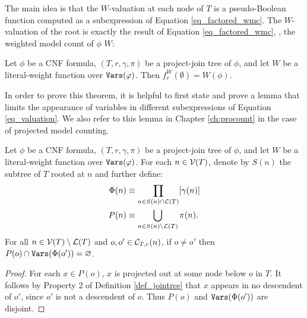 The main idea is that the $W$-valuation at each node of $T$ is a pseudo-Boolean function computed as a subexpression of Equation \eqref{eq_factored_wmc}. The $W$-valuation of the root is exactly the result of Equation \eqref{eq_factored_wmc}, \ie, the weighted model count of $\phi$ \wrt{} $W$:
\begin{theorem}
\label{thm_valuation_wmc}
    Let $\phi$ be a CNF formula, $(T, r, \gamma, \pi)$ be a project-join tree of $\phi$, and let $W$ be a literal-weight function over $\texttt{\upshape Vars}(\varphi)$.
    Then $f^W_r(\emptyset) = W(\phi)$.
\end{theorem}

In order to prove this theorem, it is helpful to first state and prove a lemma that limits the appearance of variables in different subexpressions of Equation \ref{eq_valuation}. We also refer to this lemma in Chapter \ref{ch:procount} in the case of projected model counting.
\begin{lemma}
\label{lemma:projections_branch_disjoint}
Let $\phi$ be a CNF formula, $(T, r, \gamma, \pi)$ be a project-join tree of $\phi$, and let $W$ be a literal-weight function over $\texttt{\upshape Vars}(\varphi)$. For each $n \in \mathcal{V}(T)$, denote by $S(n)$ the subtree of $T$ rooted at $n$ and further define:
\begin{align*}
    \Phi(n) &\equiv \prod_{n \in S(n) \cap \mathcal{L}(T)} [\gamma(n)] \\
    P(n) &\equiv \bigcup_{n \in S(n) \setminus \mathcal{L}(T)} \pi(n).
\end{align*}
For all $n \in \mathcal{V}(T) \setminus \mathcal{L}(T)$ and $o, o' \in \mathcal{C}_{T,r}(n)$, if $o \neq o'$ then $P(o) \cap \texttt{\upshape Vars}(\Phi(o')) = \varnothing$.
\end{lemma}
\begin{proof}
For each $x \in P(o)$, $x$ is projected out at some node below $o$ in $T$. It follows by Property 2 of Definition \ref{def_jointree} that $x$ appears in no descendent of $o'$, since $o'$ is not a descendent of $o$. Thus $P(o)$ and $\texttt{\upshape Vars}(\Phi(o'))$ are disjoint.
\end{proof}

